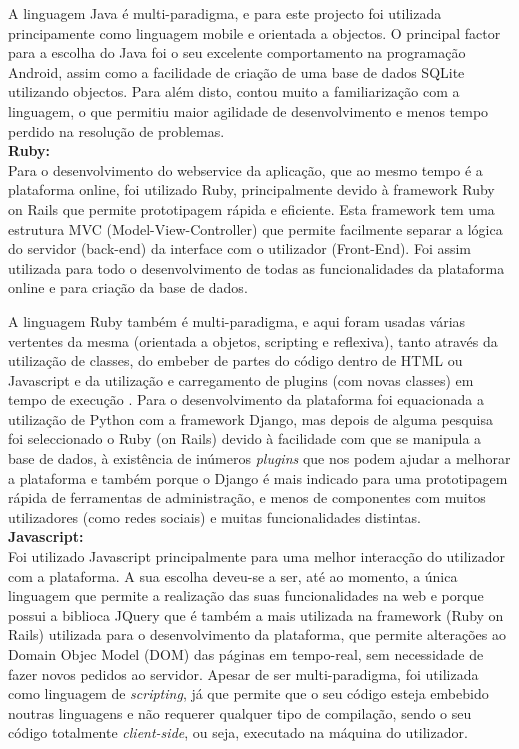 \documentclass[15pt,a4paper]{article}
\begin{document}
A linguagem Java é multi-paradigma, e para este projecto foi utilizada principamente como linguagem mobile e orientada a objectos. O principal factor para a escolha do Java foi o seu excelente comportamento na programação Android, assim como a facilidade de criação de uma base de dados SQLite utilizando objectos. Para além disto, contou muito a familiarização com a linguagem, o que permitiu maior agilidade de desenvolvimento e menos tempo perdido na resolução de problemas.
\\

\textbf{Ruby:}
\\

Para o desenvolvimento do webservice da aplicação, que ao mesmo tempo é a plataforma online, foi utilizado Ruby, principalmente devido à framework Ruby on Rails que permite prototipagem rápida e eficiente. Esta framework tem uma estrutura MVC (Model-View-Controller) que permite facilmente separar a lógica do servidor (back-end) da interface com o utilizador (Front-End). Foi assim utilizada para todo o desenvolvimento de todas as funcionalidades da plataforma online e para criação da base de dados. 

A linguagem Ruby também é multi-paradigma, e aqui foram usadas várias vertentes da mesma (orientada a objetos, scripting e reflexiva), tanto através da utilização de classes, do embeber de partes do código dentro de HTML ou Javascript e da utilização e carregamento de plugins (com novas classes) em tempo de execução . Para o desenvolvimento da plataforma foi equacionada a utilização de Python com a framework Django, mas depois de alguma pesquisa foi seleccionado o Ruby (on Rails) devido à facilidade com que se manipula a base de dados, à existência de inúmeros \textit{plugins} que nos podem ajudar a melhorar a plataforma e também porque o Django é mais indicado para uma prototipagem rápida de ferramentas de administração, e menos de componentes com muitos utilizadores (como redes sociais) e muitas funcionalidades distintas.
\\

\textbf{Javascript:}
\\

Foi utilizado Javascript principalmente para uma melhor interacção do utilizador com a plataforma. A sua escolha deveu-se a ser, até ao momento, a única linguagem que permite a realização das suas funcionalidades na web e porque possui a biblioca JQuery que é também a mais utilizada na framework (Ruby on Rails) utilizada para o desenvolvimento da plataforma, que permite alterações ao Domain Objec Model (DOM) das páginas em tempo-real, sem necessidade de fazer novos pedidos ao servidor. Apesar de ser multi-paradigma, foi utilizada como linguagem de \textit{scripting}, já que permite que o seu código esteja embebido noutras linguagens e não requerer qualquer tipo de compilação, sendo o seu código totalmente \textit{client-side}, ou seja, executado na máquina do utilizador.
\end{document}
